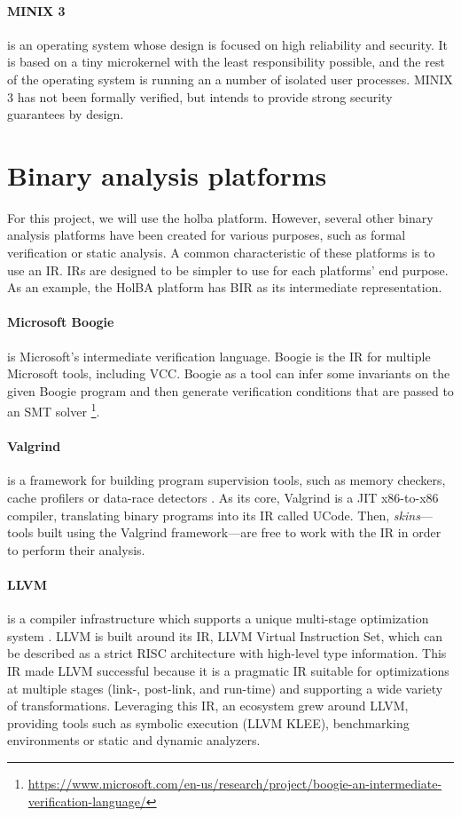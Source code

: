 \documentclass{kththesis}
\begin{document}
\paragraph{MINIX 3} is an operating system whose design is focused on high reliability and security. It is based on a tiny microkernel with the least responsibility possible, and the rest of the operating system is running an a number of isolated user processes. MINIX 3 has not been formally verified, but intends to provide strong security guarantees by design.

\section{Binary analysis platforms}

For this project, we will use the \gls{holba} platform. However, several other binary analysis platforms have been created for various purposes, such as formal verification or static analysis. A common characteristic of these platforms is to use an \gls{IR}. IRs are designed to be simpler to use for each platforms' end purpose. As an example, the HolBA platform has BIR as its intermediate representation.

\paragraph{Microsoft Boogie} is Microsoft's intermediate verification language. Boogie is the IR for multiple Microsoft tools, including VCC. Boogie as a tool can infer some invariants on the given Boogie program and then generate verification conditions that are passed to an SMT solver \footnote{\url{https://www.microsoft.com/en-us/research/project/boogie-an-intermediate-verification-language/}}.

\paragraph{Valgrind} is a framework for building program supervision tools, such as memory checkers, cache profilers or data-race detectors \cite{nethercote_valgrind:_2003}. As its core, Valgrind is a JIT x86-to-x86 compiler, translating binary programs into its IR called UCode. Then, \textit{skins}---tools built using the Valgrind framework---are free to work with the IR in order to perform their analysis.

\paragraph{LLVM} is a compiler infrastructure which supports a unique multi-stage optimization system \cite{lattner_llvm:_2002}. LLVM is built around its \gls{IR}, LLVM Virtual Instruction Set, which can be described as a strict RISC architecture with high-level type information. This IR made LLVM successful because it is a pragmatic IR suitable for optimizations at multiple stages (link-, post-link, and run-time) and supporting a wide variety of transformations. Leveraging this IR, an ecosystem grew around LLVM, providing tools such as symbolic execution (LLVM KLEE), benchmarking environments or static and dynamic analyzers.
\end{document}
